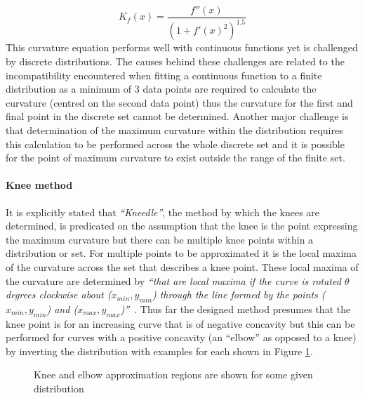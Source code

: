\begin{equation}\label{eq:curvature}
    K_f(x) = \frac{f''(x)}{(1 + f'(x)^2)^{1.5}}
\end{equation}
This curvature equation performs well with continuous functions yet is challenged by discrete distributions. The causes behind these challenges are related to the incompatibility encountered when fitting a continuous function to a finite distribution as a minimum of 3 data points are required to calculate the curvature (centred on the second data point) thus the curvature for the first and final point in the discrete set cannot be determined. Another major challenge is that determination of the maximum curvature within the distribution requires this calculation to be performed across the whole discrete set and it is possible for the point of maximum curvature to exist outside the range of the finite set.\paragraph{Knee method} It is explicitly stated that \textit{``Kneedle''}, the method by which the knees are determined, is predicated on the assumption that the knee is the point expressing the maximum curvature but there can be multiple knee points within a distribution or set. For multiple points to be approximated it is the local maxima of the curvature across the set that describes a knee point. These local maxima of the curvature are determined by \textit{``that are local maxima if the curve is rotated $\theta$ degrees clockwise about ($x_{min},y_{min}$) through the line formed by the points ($x_{min},y_{min}$) and ($x_{max},y_{max}$)''}~\cite[p.3]{kneedle_paper}. Thus far the designed method presumes that the knee point is for an increasing curve that is of negative concavity but this can be performed for curves with a positive concavity (an ``elbow'' as opposed to a knee) by inverting the distribution with examples for each shown in Figure \ref{fig:knee_elbow_example}.
\begin{figure}
    \centering
    \caption{Knee and elbow approximation regions are shown for some given distribution}
    \label{fig:knee_elbow_example}
\end{figure}
